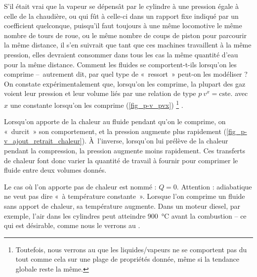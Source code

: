 			S’il était vrai que la vapeur se dépensât par le cylindre à une pression égale à celle de la chaudière, ou qui fût à celle-ci dans un rapport fixe indiqué par un coefficient quelconque, puisqu’il faut toujours à une même locomotive le même nombre de tours de roue, ou le même nombre de coups de piston pour parcourir la même distance, il s’en suivrait que tant que ces machines travaillent à la même pression, elles devraient consommer dans tous les cas la même quantité d’eau pour la même distance.
		Comment les fluides se comportent-t-ils lorsqu’on les comprime --\ autrement dit, par quel type de «~ressort~» peut-on les modéliser ? On constate expérimentalement que, lorsqu’on les comprime, la plupart des gaz voient leur pression et leur volume liés par une relation de type $p\ v^{x} = \text{cste.}$ avec $x$ une constante lorsqu’on les comprime (\cref{fig_p-v_pvx})%
			\footnote{Toutefois, nous verrons au \courscinqshort que les liquides/vapeurs ne se comportent pas du tout comme cela sur une plage de propriétés donnée, même si la tendance globale reste la même.}%
		.

		Lorsqu’on apporte de la chaleur au fluide pendant qu’on le comprime, on «~durcit~» son comportement, et la pression augmente plus rapidement (\cref{fig_p-v_ajout_retrait_chaleur}). À~l’inverse, lorsqu’on lui prélève de la chaleur pendant la compression, la pression augmente moins rapidement. Ces transferts de chaleur font donc varier la quantité de travail à fournir pour comprimer le fluide entre deux volumes donnés.
		
		Le cas où l’on apporte pas de chaleur est nommé  : $Q = 0$. Attention : adiabatique ne veut pas dire «~à température constante~». Lorsque l’on comprime un fluide sans apport de chaleur, sa température augmente. Dans un moteur diesel, par exemple, l’air dans les cylindres peut atteindre \SI{900}{\degreeCelsius} avant la combustion -- ce qui est désirable, comme nous le verrons au \courssept.


